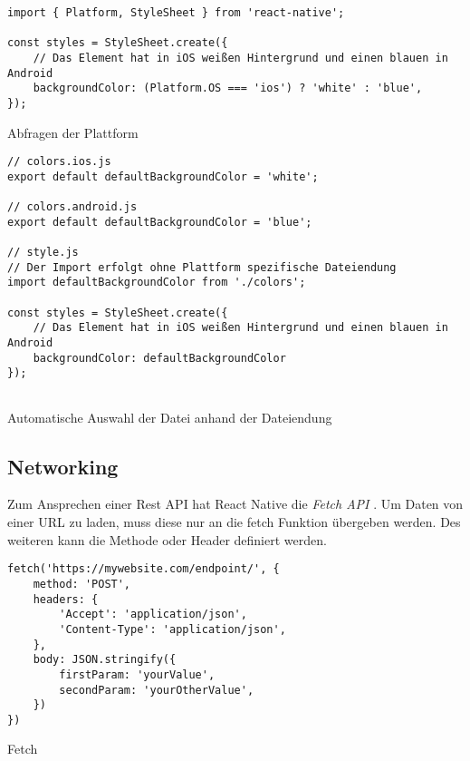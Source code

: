\begin{listing}[H]
    \begin{verbatim}
import { Platform, StyleSheet } from 'react-native';

const styles = StyleSheet.create({
    // Das Element hat in iOS weißen Hintergrund und einen blauen in Android
    backgroundColor: (Platform.OS === 'ios') ? 'white' : 'blue',
});
    \end{verbatim}
    \caption{Abfragen der Plattform}
    \label{lst:platform_os}
\end{listing}

\begin{listing}[H]
    \begin{verbatim}
// colors.ios.js
export default defaultBackgroundColor = 'white';

// colors.android.js
export default defaultBackgroundColor = 'blue';
 
// style.js
// Der Import erfolgt ohne Plattform spezifische Dateiendung
import defaultBackgroundColor from './colors';
 
const styles = StyleSheet.create({
    // Das Element hat in iOS weißen Hintergrund und einen blauen in Android
    backgroundColor: defaultBackgroundColor
});
     
    \end{verbatim}
    \caption{Automatische Auswahl der Datei anhand der Dateiendung}
    \label{lst:platform_file}
\end{listing}

\subsection{Networking}
Zum Ansprechen einer Rest API hat React Native die \textit{Fetch API} \cite{facebook_inc._fetch_2017}. Um Daten von einer URL zu laden, muss diese nur an die fetch Funktion übergeben werden. Des weiteren kann die Methode oder Header definiert werden. 


\begin{listing}[H]
    \begin{verbatim}
fetch('https://mywebsite.com/endpoint/', {
    method: 'POST',
    headers: {
        'Accept': 'application/json',
        'Content-Type': 'application/json',
    },
    body: JSON.stringify({
        firstParam: 'yourValue',
        secondParam: 'yourOtherValue',
    })
})
    \end{verbatim}
    \caption{Fetch \cite{facebook_inc._fetch_2017}}
    \label{lst:fetch}
\end{listing}

